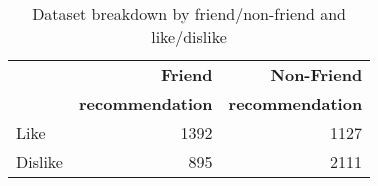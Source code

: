 \begin{table}
\centering
\begin{tabular}{|>{\small}l|>{\small}r|>{\small}r|}\hline
&\textbf{Friend}  & \textbf{Non-Friend} \\
&\textbf{recommendation}  & \textbf{recommendation} \\
\hline
Like& 1392 & 1127 \\
\hline
Dislike& 895 & 2111\\
\hline
\end{tabular}
\caption{Dataset breakdown by friend/non-friend and like/dislike}
\end{table}


